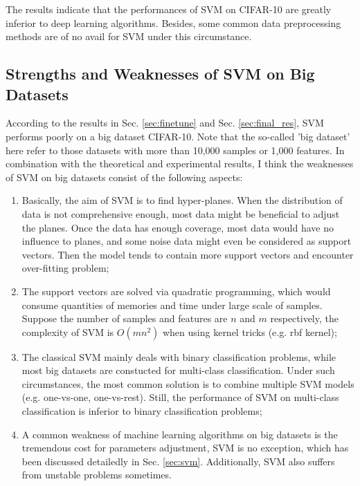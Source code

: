 \documentclass[12pt,a4paper]{article}
\theoremstyle{definition}
\begin{document}
The results indicate that the performances of SVM on CIFAR-10 are greatly inferior to deep learning algorithms. Besides, some common data preprocessing methods are of no avail for SVM under this circumstance.

\subsection{Strengths and Weaknesses of SVM on Big Datasets}

According to the results in Sec. \ref{sec:finetune} and Sec. \ref{sec:final_res}, SVM performs poorly on a big dataset CIFAR-10. Note that the so-called 'big dataset' here refer to those datasets with more than 10,000 samples or 1,000 features. In combination with the theoretical and experimental results, I think the weaknesses of SVM on big datasets consist of the following aspects:

\begin{enumerate}
	\item Basically, the aim of SVM is to find hyper-planes. When the distribution of data is not comprehensive enough, most data might be beneficial to adjust the planes. Once the data has enough coverage, most data would have no influence to planes, and some noise data might even be considered as support vectors. Then the model tends to contain more support vectors and encounter over-fitting problem;
	
	\item The support vectors are solved via quadratic programming, which would consume quantities of memories and time under large scale of samples. Suppose the number of samples and features are $n$ and $m$ respectively, the complexity of SVM is $O(mn^2)$ when using kernel tricks (e.g. rbf kernel);
	
	\item The classical SVM mainly deals with binary classification problems, while most big datasets are constucted for multi-class classification. Under such circumstances, the most common solution is to combine multiple SVM models (e.g. one-vs-one, one-vs-rest). Still, the performance of SVM on multi-class classification is inferior to binary classification problems;
	
	\item A common weakness of machine learning algorithms on big datasets is the tremendous cost for parameters adjustment, SVM is no exception, which has been discussed detailedly in Sec. \ref{sec:svm}. Additionally, SVM also suffers from unstable problems sometimes.
\end{enumerate}
\end{document}
